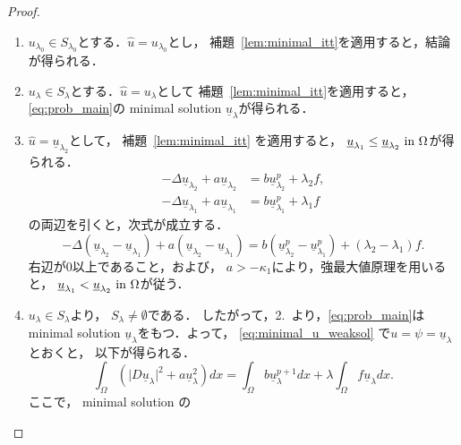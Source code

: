 \begin{proof}
 \begin{enumerate}[1.] \sage
  \item $u_{\lambda_0} \in S_{\lambda_0}$とする．$\hat{u} =
        u_{\lambda_0}$とし，
        補題~\ref{lem:minimal_itt}を適用すると，結論が得られる．
  \item $u_{\lambda} \in S_{\lambda}$とする．$\hat{u} =
        u_{\lambda}$として
        補題~\ref{lem:minimal_itt}を適用すると，
        \ref{eq:prob_main}の
        minimal solution $\underline{u}_\lambda$が得られる．
  \item $\hat{u} = \underline{u}_{\lambda_2}$として，
        補題~\ref{lem:minimal_itt}
        を適用すると，
        $\underline{u}_{\lambda_1} \leq
        \underline{u}_{\lambda_2} ~\text{in}~ \Omega$が得られる．
        \begin{align*}
         -\Delta \underline{u}_{\lambda_2} + a
         \underline{u}_{\lambda_2} 
         &= b \underline{u}_{\lambda_2}^p + \lambda_2 f, \\
         -\Delta \underline{u}_{\lambda_1} + a
         \underline{u}_{\lambda_1} 
         &= b \underline{u}_{\lambda_1}^p + \lambda_1 f
        \end{align*}
        の両辺を引くと，次式が成立する．
        \[
         -\Delta (\underline{u}_{\lambda_2} - \underline{u}_{\lambda_1}) + a
         (\underline{u}_{\lambda_2} - \underline{u}_{\lambda_1} )
         = b (\underline{u}_{\lambda_2}^p -
        \underline{u}_{\lambda_1}^p) + (\lambda_2 - \lambda_1) f.
        \]
        右辺が$0$以上であること，および，
        $a > -\kappa_1$により，強最大値原理を用いると，
        $\underline{u}_{\lambda_1} <
        \underline{u}_{\lambda_2} ~\text{in}~ \Omega$が従う．
  \item $u_\lambda \in S_\lambda$より，
        $S_\lambda \neq \emptyset$である．
        したがって，2.~より，\ref{eq:prob_main}は minimal solution
        $\underline{u}_\lambda$をもつ．よって，
        \eqref{eq:minimal_u_weaksol}
        で$u = \psi = \underline{u}_\lambda$とおくと，
        以下が得られる．
        \begin{equation}
         \int_\Omega \left( \lvert D\underline{u}_\lambda \rvert^2 + a
                      \underline{u}_\lambda^2 \right) dx 
          = \int_\Omega b\underline{u}_\lambda^{p+1} dx 
          + \lambda \int_\Omega f \underline{u}_\lambda dx.
          \label{eq:minimal_inp_same_weak}
        \end{equation}
        ここで，
        minimal solution の

\end{enumerate}
\end{proof}
